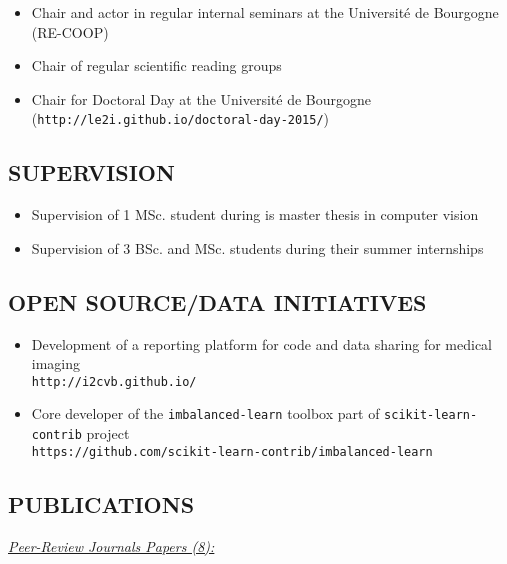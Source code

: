 {\begin{itemize}
\item Chair and actor in regular internal seminars at the Universit\'e de Bourgogne (RE-COOP)
\item Chair of regular scientific reading groups
\item Chair for Doctoral Day at the Universit\'e de Bourgogne (\texttt{http://le2i.github.io/doctoral-day-2015/})
\end{itemize}

\subsection{SUPERVISION}

\begin{itemize}
\item Supervision of 1 MSc. student during is master thesis in computer vision
\item Supervision of 3 BSc. and MSc. students during their summer internships
\end{itemize}


\subsection{OPEN SOURCE/DATA INITIATIVES}

\begin{itemize}
\item Development of a reporting platform for code and data sharing for medical imaging \\ \texttt{http://i2cvb.github.io/}
\item Core developer of the \texttt{imbalanced-learn} toolbox part of \texttt{scikit-learn-contrib} project \\ \texttt{https://github.com/scikit-learn-contrib/imbalanced-learn}
\end{itemize}

\subsection{PUBLICATIONS}

\underline{\textit{Peer-Review Journals Papers (8):}}

\begin{enumerate}


\end{enumerate}}
